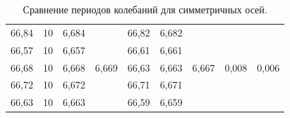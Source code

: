 \begin{table}[h!]
\begin{tabular}{|cccc|ccccc|}
\multicolumn{1}{|c|}{66,84} &
  \multicolumn{1}{c|}{10} &
  \multicolumn{1}{c|}{6,684} &
  \multirow{5}{*}{6,669} &
  \multicolumn{1}{c|}{66,82} &
  \multicolumn{1}{c|}{6,682} &
  \multicolumn{1}{c|}{\multirow{5}{*}{6,667}} &
  \multicolumn{1}{c|}{\multirow{5}{*}{0,008}} &
  \multirow{5}{*}{0,006} \\ \cline{1-3} \cline{5-6}
\multicolumn{1}{|c|}{66,57} &
  \multicolumn{1}{c|}{10} &
  \multicolumn{1}{c|}{6,657} &
   &
  \multicolumn{1}{c|}{66,61} &
  \multicolumn{1}{c|}{6,661} &
  \multicolumn{1}{c|}{} &
  \multicolumn{1}{c|}{} &
   \\ \cline{1-3} \cline{5-6}
\multicolumn{1}{|c|}{66,68} &
  \multicolumn{1}{c|}{10} &
  \multicolumn{1}{c|}{6,668} &
   &
  \multicolumn{1}{c|}{66,63} &
  \multicolumn{1}{c|}{6,663} &
  \multicolumn{1}{c|}{} &
  \multicolumn{1}{c|}{} &
   \\ \cline{1-3} \cline{5-6}
\multicolumn{1}{|c|}{66,72} &
  \multicolumn{1}{c|}{10} &
  \multicolumn{1}{c|}{6,672} &
   &
  \multicolumn{1}{c|}{66,71} &
  \multicolumn{1}{c|}{6,671} &
  \multicolumn{1}{c|}{} &
  \multicolumn{1}{c|}{} &
   \\ \cline{1-3} \cline{5-6}
\multicolumn{1}{|c|}{66,63} &
  \multicolumn{1}{c|}{10} &
  \multicolumn{1}{c|}{6,663} &
   &
  \multicolumn{1}{c|}{66,59} &
  \multicolumn{1}{c|}{6,659} &
  \multicolumn{1}{c|}{} &
  \multicolumn{1}{c|}{} &
   \\ \hline
\end{tabular}
\caption{Сравнение периодов колебаний для симметричных осей.}
\label{tabl2}
\end{table}

